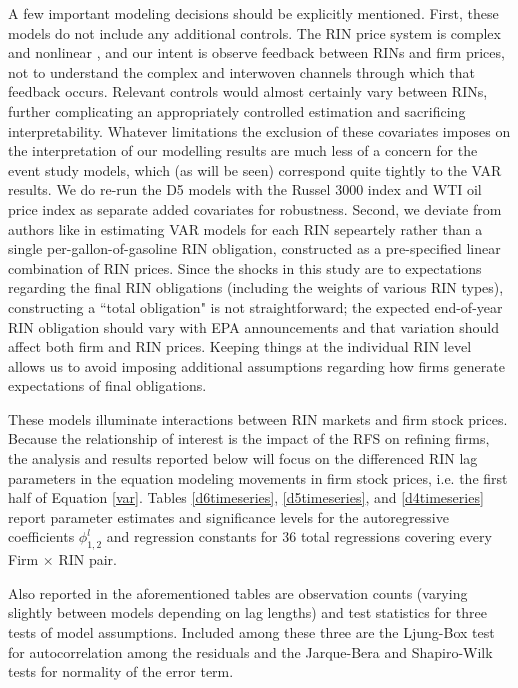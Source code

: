 \documentclass[11pt]{article}
\begin{document}
A few important modeling decisions should be explicitly mentioned. First, these models do not include any additional controls. The RIN price system is complex and nonlinear \citep{Serra2011}, and our intent is observe feedback between RINs and firm prices, not to understand the complex and interwoven channels through which that feedback occurs. Relevant controls would almost certainly vary between RINs, further complicating an appropriately controlled estimation and sacrificing interpretability. Whatever limitations the exclusion of these covariates imposes on the interpretation of our modelling results are much less of a concern for the event study models, which (as will be seen) correspond quite tightly to the VAR results. We do re-run the D5 models with the Russel 3000 index and WTI oil price index as separate added covariates for robustness. Second, we deviate from authors like \cite{Knittel2017} in estimating VAR models for each RIN sepeartely rather than a single per-gallon-of-gasoline RIN obligation, constructed as a pre-specified linear combination of RIN prices. Since the shocks in this study are to expectations regarding the final RIN obligations (including the weights of various RIN types), constructing a ``total obligation" is not straightforward; the expected end-of-year RIN obligation should vary with EPA announcements and that variation should affect both firm and RIN prices. Keeping things at the individual RIN level allows us to avoid imposing additional assumptions regarding how firms generate expectations of final obligations.

These models illuminate interactions between RIN markets and firm stock prices. Because the relationship of interest is the impact of the RFS on refining firms, the analysis and results reported below will focus on the differenced RIN lag parameters in the equation modeling movements in firm stock prices, i.e. the first half of Equation \ref{var}. Tables \ref{d6timeseries}, \ref{d5timeseries}, and \ref{d4timeseries} report parameter estimates and significance levels for the autoregressive coefficients $\phi_{1,2}^l$ and regression constants for 36 total regressions covering every Firm $\times$ RIN pair. 

Also reported in the aforementioned tables are observation counts (varying slightly between models depending on lag lengths) and test statistics for three tests of model assumptions. Included among these three are the Ljung-Box test for autocorrelation among the residuals and the Jarque-Bera and Shapiro-Wilk tests for normality of the error term.
\end{document}
